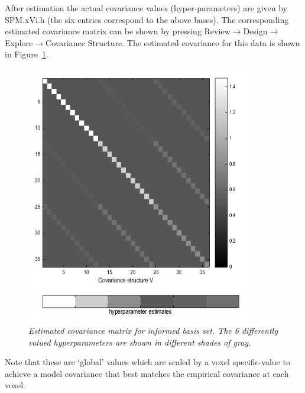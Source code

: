 After estimation the actual covariance values (hyper-parameters) are given by SPM.xVi.h (the six entries correspond to the above bases). The corresponding estimated 
covariance matrix can be shown by pressing Review$\rightarrow$Design$\rightarrow$Explore$\rightarrow$Covariance Structure. The estimated covariance for this data is shown in Figure~\ref{informed_covariance}.
\begin{figure}
\begin{center}
\includegraphics[width=100mm]{faces_group/informed_covariance}
\caption{\em Estimated covariance matrix for informed basis set. The 6 differently valued hyperparameters are shown in different shades of gray. \label{informed_covariance}}
\end{center}
\end{figure}
Note that these are `global' values which are scaled by a voxel specific-value to achieve a model covariance that best matches the empirical covariance at each voxel. 

